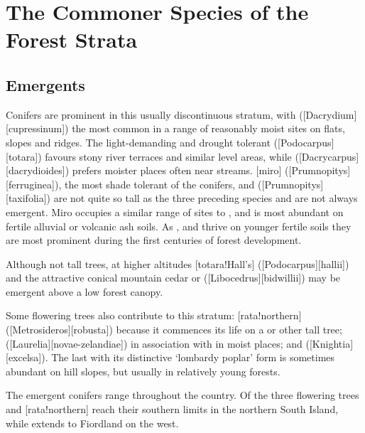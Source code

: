 \section{The Commoner Species of the Forest Strata}

\subsection{Emergents}

Conifers are prominent in this usually discontinuous stratum, with  ([Dacrydium][cupressinum]) the most common in a range of reasonably moist sites on flats, slopes and ridges.
The light-demanding and drought tolerant  ([Podocarpus][totara]) favours stony river terraces and similar level areas, while  ([Dacrycarpus][dacrydioides]) prefers moister places often near streams.
[miro] ([Prumnopitys][ferruginea]), the most shade tolerant of the conifers, and  ([Prumnopitys][taxifolia]) are not quite so tall as the three preceding species and are not always emergent.
Miro occupies a similar range of sites to , and  is most abundant on fertile alluvial or volcanic ash soils.
As ,  and  thrive on younger fertile soils they are most prominent during the first centuries of forest development.

Although not tall trees, at higher altitudes [totara!Hall's] ([Podocarpus][hallii]) and the attractive conical mountain cedar or  ([Libocedrus][bidwillii]) may be emergent above a low forest canopy.

Some flowering trees also contribute to this stratum: [rata!northern] ([Metrosideros][robusta]) because it commences its life on a  or other tall tree;  ([Laurelia][novae-zelandiae]) in association with  in moist places; and  ([Knightia][excelsa]).
The last with its distinctive `lombardy poplar' form is sometimes abundant on hill slopes, but usually in relatively young forests.

The emergent conifers range throughout the country.
Of the three flowering trees  and [rata!northern] reach their southern limits in the northern South Island, while  extends to Fiordland on the west.

